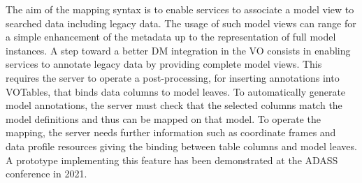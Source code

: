 The aim of the mapping syntax is to enable services to associate a model view to searched data including legacy data.
The usage of such model views can range for a simple enhancement of the metadata up to the representation of full model instances.
A step toward a better DM integration in the VO consists in enabling services to annotate
legacy data by providing complete model
views. This requires the server to operate a post-processing, for inserting annotations into VOTables, 
that binds data columns to model leaves.
To automatically generate model annotations, the server must check that the selected columns 
match the model definitions and thus can be
mapped on that model. To operate the mapping, the server needs further information
such as coordinate frames and data profile resources giving the binding between table
columns and model leaves. A prototype \citep{2201.01732} implementing this feature
has been demonstrated at the ADASS conference in 2021.

